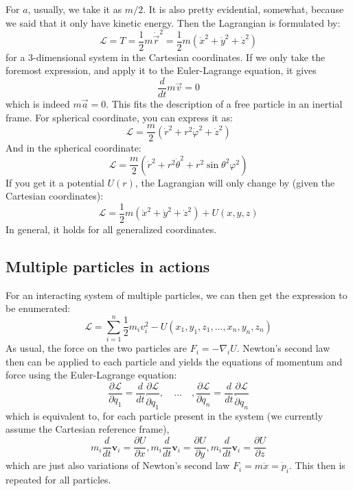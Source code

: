 For $a$, usually, we take it as $m/2$. It is also pretty evidential, somewhat, because we said that it only have kinetic energy. Then the Lagrangian is formulated by: 
$$
\mathcal{L} = T = \frac{1}{2}m \dot{\vec{r}}^{2} = \frac{1}{2} m (\dot{x}^2 + \dot{y}^{2}+ \dot{z}^{2})
$$
for a 3-dimensional system in the Cartesian coordinates. If we only take the foremost expression, and apply it to the Euler-Lagrange equation, it gives 
$$
\frac{d}{dt} m\vec{v} = 0
$$
which is indeed $m\vec{a}=0$. This fits the description of a free particle in an inertial frame. For spherical coordinate, you can express it as: 
$$
\mathcal{L} = \frac{m}{2} (\dot{r}^{2} + r^2 \dot{\varphi}^{2} + \dot{z}^{2})
$$
And in the spherical coordinate: 
$$
\mathcal{L} = \frac{m}{2} (\dot{r}^{2} + r^2 \dot{\theta}^{2} + r^2 \sin{\theta}^{2}\varphi^{2})
$$
If you get it a potential $U(r)$, the Lagrangian will only change by (given the Cartesian coordinates): 
$$
\mathcal{L} = \frac{1}{2} m (\dot{x}^2 + \dot{y}^{2}+ \dot{z}^{2}) + U(x,y,z)
$$
In general, it holds for all generalized coordinates. 


\subsection{Multiple particles in actions}
For an interacting system of multiple particles, we can then get the expression to be enumerated: 
\begin{equation}
  \mathcal{L} = \sum_{i=1}^{n} \frac{1}{2}m_{i} v_{i}^{2} - U(x_1, y_1, z_1, \dots , x_n, y_n, z_n)
\end{equation}
As usual, the force on the two particles are $F_{i}=-\nabla_{i}U$. Newton's second law then can be applied to each particle and yields the equations of momentum and force using the Euler-Lagrange equation: 
\begin{equation}
  \frac{\partial \mathcal{L}}{\partial q_{1}}=\frac{d}{dt} \frac{\partial \mathcal{L}}{\dot{\partial}q_{1}},\quad \dots \quad , \frac{\partial \mathcal{L}}{\partial q_{n}}= \frac{d}{dt} \frac{\partial \mathcal{L}}{\dot{\partial}q_{n}}
\end{equation}
which is equivalent to, for each particle present in the system (we currently assume the Cartesian reference frame),
\begin{equation}
  m_{i} \frac{d}{dt} \mathbf{v}_{i} = \frac{\partial U}{\partial x}, m_{i} \frac{d}{dt} \mathbf{v}_{i} = \frac{\partial U}{\partial y}, m_{i} \frac{d}{dt} \mathbf{v}_{i} = \frac{\partial U}{\partial z}
\end{equation}
which are just also variations of Newton's second law $F_{i}=m\ddot{x}=\dot{p}_{i}$. This then is repeated for all particles. 

